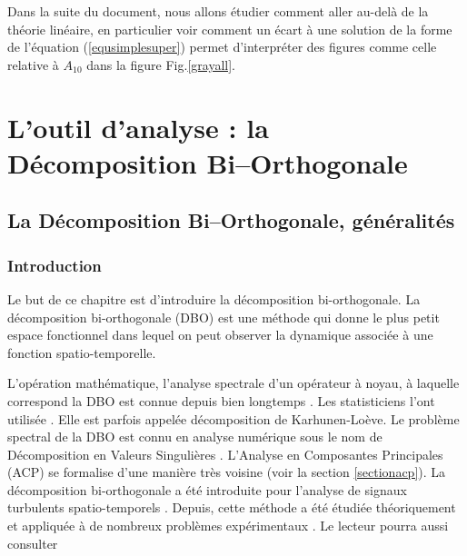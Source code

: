 \documentclass{book}
\begin{document}
Dans la suite du document, nous allons \'etudier comment aller au-del\`a
de la th\'eorie lin\'eaire, en particulier voir comment un \'ecart \`a
une solution de la forme de l'\'equation (\ref{equsimplesuper}) permet
d'interpr\'eter des figures comme celle relative \`a $A_{10}$ dans la
figure Fig.\ref{grayall}.




\part[L'outil d'analyse : \hspace{25 truecm}\null { } la D\'ecomposition Bi--Orthogonale]{L'outil d'analyse : la D\'ecomposition Bi--Orthogonale}

\chapter{La D\'ecomposition Bi--Orthogonale, g\'en\'eralit\'es}

\section{Introduction}

Le but de ce chapitre est d'introduire la d\'ecomposition
bi-orthogonale. La
d\'ecomposition bi-orthogonale (DBO) est une m\'ethode 
qui donne le plus petit espace fonctionnel dans 
lequel on peut observer
la dynamique associ\'ee \`a une fonction spatio-temporelle.

L'op\'eration math\'ematique, l'analyse spectrale d'un op\'erateur \`a
noyau, \`a laquelle correspond la DBO
est connue depuis bien longtemps
\cite{Courant24,VonNeuman35}. Les statisticiens l'ont utilis\'ee
\cite{Loeve55,Karhunen44}. Elle
est parfois appel\'ee d\'ecomposition de
Karhunen-Lo\`eve.
Le probl\`eme
spectral de la DBO est connu en analyse num\'erique sous le nom de
D\'ecomposition en Valeurs 
Singuli\`eres
\cite{Press92}. 
L'Analyse en Composantes Principales (ACP) se formalise d'une
mani\`ere tr\`es voisine (voir la section \ref{sectionacp}).
La d\'ecomposition bi-orthogonale a \'et\'e introduite
 pour l'analyse de signaux turbulents
spatio-temporels \cite{Lumley72,Lumley81}. 
Depuis, cette m\'ethode a \'et\'e \'etudi\'ee th\'eoriquement
\cite{Guyonnet91,Aubry88,Aubry91a,Aubry91b,Aubry92,Aubry94,Aubry95a,Aubry95b}  
et appliqu\'ee \`a de nombreux probl\`emes exp\'erimentaux
\cite{Dudok94,Kolodner95,Vautard89,Vautard92}. 
Le lecteur pourra aussi consulter \cite{Lumley90,Sirovich89,Broomhead86,Newell88}
\end{document}
